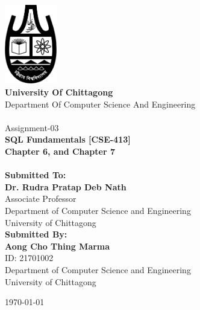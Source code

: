 \begin{titlepage}
\begin{center}

\includegraphics[width=0.17\textwidth]{Figs/CU_Logo.png}~\\[1cm]

\textbf{\huge{University Of Chittagong}}\\[0.2cm]
\Large{Department Of Computer Science And Engineering}
\\[1.2cm]


\HRule \\[0.15cm]
{
	Assignment-03 \\
	\textbf{\Large{SQL Fundamentals [CSE-413]\\ Chapter 6, and Chapter 7}}
	\\[0.15cm]
}
\HRule \\[1.2cm]

\large\textbf{Submitted To:}\\
\Large\textbf{Dr. Rudra Pratap Deb Nath}\\
Associate Professor\\
Department of Computer Science and Engineering\\
University of Chittagong\\[1cm]

\large\textbf{Submitted By:}\\
\Large\textbf{Aong Cho Thing Marma}\\
ID: 21701002\\
Department of Computer Science and Engineering\\
University of Chittagong\\

\vfill

{\large \today}

\end{center}
\end{titlepage}
